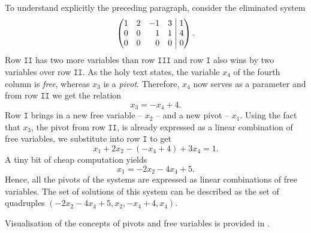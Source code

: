 To understand explicitly the preceding paragraph, consider the eliminated system
\[
 \left(
  \begin{matrix*}[r]
   1 & 2 & -1 & 3\\
   0 & 0 & 1 & 1\\
   0 & 0 & 0 & 0
  \end{matrix*}
  \hspace{1mm}
 \right|
 \left.
  \begin{matrix*}[r]
   1\\
   4\\
   0
  \end{matrix*}
 \right).
\]
Row $\mathtt{II}$ has two more variables than row $\mathtt{III}$ and row
$\mathtt{I}$ also wins by two variables over row $\mathtt{II}$. As the holy text
states, the variable $x_4$ of the fourth column is \emph{free}, whereas $x_3$ is
a \emph{pivot}. Therefore, $x_4$ now serves as a parameter and from row
$\mathtt{II}$ we get the relation
\[
 x_3 = -x_4 + 4.
\]
Row $\mathtt{I}$ brings in a new free variable -- $x_2$ -- and a new pivot --
$x_1$. Using the fact that $x_3$, the pivot from row $\mathtt{II}$, is already
expressed as a linear combination of free variables, we substitute into row
$\mathtt{I}$ to get
\[
 x_1 + 2x_2 - (-x_4 + 4) + 3x_4 = 1.
\]
A tiny bit of cheap computation yields
\[
 x_1 = -2x_2 -4x_4 + 5.
\]
Hence, all the pivots of the systems are expressed as linear combinations of
free variables. The set of solutions of this system can be described as the set
of quadruples $(-2x_2 - 4x_4 + 5, x_2, -x_4 + 4, x_4)$.

Visualisation of the concepts of pivots and free variables is provided in
.

